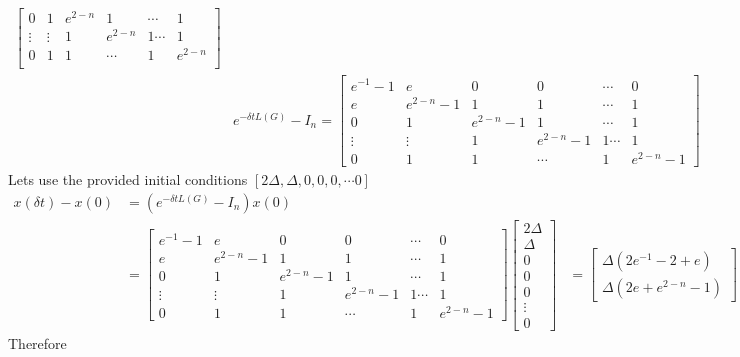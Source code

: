 \documentclass{article}
\begin{document}
\begin{problem}
\begin{align*}
\begin{bmatrix*}
             0 & 1 & e^{2-n} & 1 & \cdots & 1 \\
             \vdots & \vdots & 1&e^{2-n} &1 \cdots &1\\
             0& 1&1&\cdots &1&e^{2-n}\\
        \end{bmatrix*}\\
        &e^{-\delta t L(G)} - I_n= \begin{bmatrix*}
            e^{-1} - 1 & e & 0 & 0 & \cdots &0 \\
            e & e^{2-n} - 1 & 1 & 1 & \cdots & 1\\
             0 & 1 & e^{2-n} - 1 & 1 & \cdots & 1 \\
             \vdots & \vdots & 1 &e^{2-n} - 1 &1 \cdots &1\\
             0& 1&1&\cdots &1&e^{2-n} - 1
        \end{bmatrix*}
    \end{align*}
    Lets use the provided initial conditions $[2\Delta, \Delta, 0, 0, 0, \cdots 0]$ 
    \begin{align*}
        x(\delta t) - x(0) &= (e^{-\delta t L(G)} - I_n) x(0) \\
        &= \begin{bmatrix*}
            e^{-1} - 1 & e & 0 & 0 & \cdots &0 \\
            e & e^{2-n} - 1 & 1 & 1 & \cdots & 1\\
             0 & 1 & e^{2-n} - 1 & 1 & \cdots & 1 \\
             \vdots & \vdots & 1 &e^{2-n} - 1 &1 \cdots &1\\
             0& 1&1&\cdots &1&e^{2-n} - 1
        \end{bmatrix*}
        \begin{bmatrix*}
            2\Delta \\ \Delta \\ 0 \\ 0 \\ 0 \\ \vdots \\ 0
        \end{bmatrix*}
        &= \begin{bmatrix*}
            \Delta (2 e^{-1} - 2 + e)\\
            \Delta (2 e + e^{2-n}  - 1) 
        \end{bmatrix*} \leq 0
    \end{align*}
    Therefore 
\end{problem}
\end{document}
